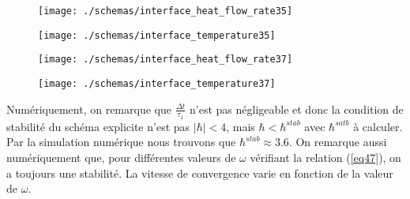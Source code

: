 \documentclass[11pt,a4paper]{scrartcl}%
\newcommand{\va}[1]{\left\lvert#1\right\rvert}%
\begin{document}
	\begin{figure}[h]
		\begin{minipage}[c]{.46\linewidth}
			\centering
			\texttt{[image: ./schemas/interface\_heat\_flow\_rate35]}
			\label{Fig.6}
		\end{minipage}
		\hfill%
		\begin{minipage}[c]{.46\linewidth}
			\centering
			\texttt{[image: ./schemas/interface\_temperature35]}
			\label{Fig.7}
		\end{minipage}
	\end{figure}
	\begin{figure}[h]
		\begin{minipage}[c]{.46\linewidth}
			\centering
			\texttt{[image: ./schemas/interface\_heat\_flow\_rate37]}
			\label{Fig.8}
		\end{minipage}
		\hfill%
		\begin{minipage}[c]{.46\linewidth}
			\centering
			\texttt{[image: ./schemas/interface\_temperature37]}
			\label{Fig.9}
		\end{minipage}
	\end{figure}
	
	Numériquement, on remarque que $\frac{\Delta t}{\tau_1}$ n'est pas négligeable et donc la condition de stabilité du schéma explicite n'est pas $\va{\hbar}<4$, mais $\hbar<\hbar^{stab}$ avec $\hbar^{satb}$ à calculer. Par la simulation numérique nous trouvons que $\hbar^{stab}\approx 3.6$. On remarque aussi numériquement que, pour différentes valeurs de $\omega$ vérifiant la relation (\ref{eq47}), on a toujours une stabilité. La vitesse de convergence varie en fonction de la valeur de $\omega$. 	
	\newpage
\end{document}
